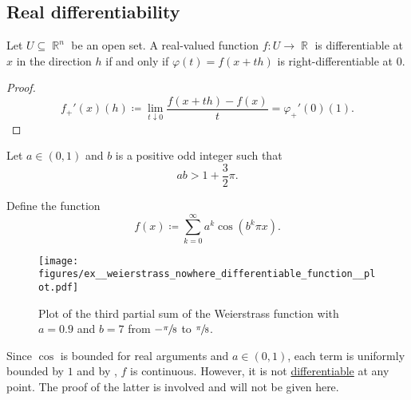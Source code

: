 \subsection{Real differentiability}\label{subsec:real_differentiability}

\begin{proposition}\label{thm:real_valued_differentiability}
  Let \( U \subseteq \BbbR^n \) be an open set. A real-valued function \( f: U \to \BbbR \) is differentiable at \( x \) in the direction \( h \) if and only if \( \varphi(t) = f(x + th) \) is right-differentiable at \( 0 \).
\end{proposition}
\begin{proof}
  \begin{equation*}
    f_+'(x)(h) \coloneqq \lim_{t \downarrow 0} \frac {f(x + th) - f(x)} t = \varphi_+'(0)(1).
  \end{equation*}
\end{proof}

\begin{example}\label{ex:weierstrass_nowhere_differentiable_function}
  Let \( a \in (0, 1) \) and \( b \) is a positive odd integer such that
  \begin{equation*}
    ab > 1 + \frac 3 2 \pi.
  \end{equation*}

  Define the function
  \begin{equation*}
    f(x) \coloneqq \sum_{k=0}^\infty a^k \cos(b^k \pi x).
  \end{equation*}

  \begin{figure}
    \centering
    \texttt{[image: figures/ex\_\_weierstrass\_nowhere\_differentiable\_function\_\_plot.pdf]}
    \caption
    {
      Plot of the third partial sum of the Weierstrass function with \( a = 0.9 \) and \( b = 7 \) from \( -\sfrac \pi 8 \) to \( \sfrac \pi 8 \).
    }
    \label{ex:weierstrass_nowhere_differentiable_function/plot}
  \end{figure}

  Since \( \cos \) is bounded for real arguments and \( a \in (0, 1) \), each term is uniformly bounded by \( 1 \) and by , \( f \) is continuous. However, it is not \hyperref[def:differentiability]{differentiable} at any point. The proof of the latter is involved and will not be given here.
\end{example}
